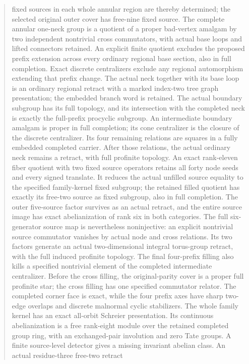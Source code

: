 \documentclass[11pt,a4paper]{article}
\begin{document}
\begin{abstract}
fixed sources in each whole annular region are thereby determined; the
selected original outer cover has free-nine fixed source. The complete
annular one-neck group is a quotient of a proper bad-vertex amalgam by
two independent nontrivial cross commutators, with actual base loops
and lifted connectors retained. An explicit finite quotient excludes the proposed prefix extension
across every ordinary regional base section, also in full completion.
Exact discrete centralizers exclude any regional automorphism extending
that prefix change. The actual neck together with its base loop is an
ordinary regional retract with a marked index-two tree graph presentation;
the embedded branch word is retained. The actual boundary subgroup
has its full topology, and its intersection with the completed neck is
exactly the full-prefix procyclic subgroup. An intermediate boundary
amalgam is proper in full completion; its cone centralizer is the closure
of the discrete centralizer. Its four remaining relations are squares
in a fully embedded completed carrier. After those relations, the actual
ordinary neck remains a retract, with full profinite topology. An exact
rank-eleven fiber quotient with two fixed source operators retains all
forty node seeds and every signed translate. It reduces the actual
unfilled source equality to the specified family-kernel fixed subgroup;
the retained filled quotient has exactly its free-two source as fixed
subgroup, also in full completion. The outer five-source factor survives
as an actual retract, and the entire source image has exact abelianization
of rank six in both categories. The full six-generator source map is
nevertheless noninjective: an explicit nontrivial source commutator
vanishes by actual node and cross relations. Its two factors generate
an actual two-dimensional integral torus-group retract, with the full
induced profinite topology. The final four-prefix filling also kills a
specified nontrivial element of the completed intermediate centralizer.
Before the cross filling, the original-parity cover is a proper full
profinite star; the cross filling has one specified commutator relator.
The completed corner face is exact, while the four prefix axes have
sharp two-edge overlaps and discrete malnormal cyclic stabilizers.
The whole family kernel has an exact all-orbit Schreier presentation.
Its continuous abelianization is a free rank-eight module over the
retained completed group ring, with an exchanged-pair involution and
zero Tate groups. A finite source-level detector gives a missing
invariant abelian class. An actual residue-three free-two retract

\end{abstract}
\end{document}

